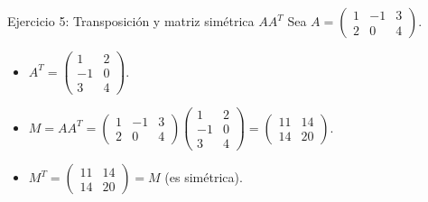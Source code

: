 \documentclass[11pt]{beamer}
\begin{document}
\begin{frame}{Ejercicio 5: Transposición y matriz simétrica $AA^T$}
  Sea $A = \begin{pmatrix} 1 & -1 & 3 \\ 2 & 0 & 4 \end{pmatrix}$.
  \begin{itemize}
    \item $A^T = \begin{pmatrix} 1 & 2 \\ -1 & 0 \\ 3 & 4 \end{pmatrix}$.
    \item $M = AA^T = \begin{pmatrix} 1 & -1 & 3 \\ 2 & 0 & 4 \end{pmatrix} \begin{pmatrix} 1 & 2 \\ -1 & 0 \\ 3 & 4 \end{pmatrix} = \begin{pmatrix} 11 & 14 \\ 14 & 20 \end{pmatrix}$.
    \item $M^T = \begin{pmatrix} 11 & 14 \\ 14 & 20 \end{pmatrix} = M$ (es simétrica).
  \end{itemize}
\end{frame}
\end{document}
